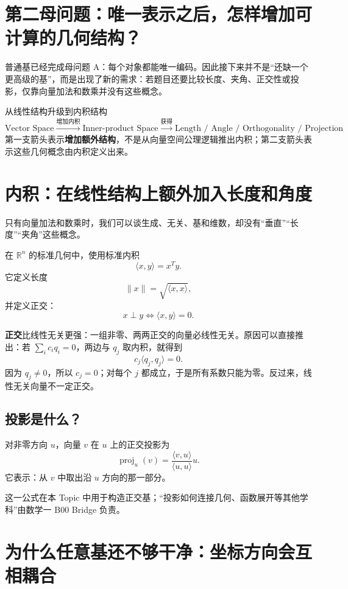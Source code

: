 \documentclass[11pt,a4paper]{ctexart}
\newcommand{\kw}[1]{\textbf{\color{deep}#1}}
\begin{document}
\section{第二母问题：唯一表示之后，怎样增加可计算的几何结构？}

普通基已经完成母问题 A：每个对象都能唯一编码。因此接下来并不是“还缺一个更高级的基”，而是出现了新的需求：若题目还要比较长度、夹角、正交性或投影，仅靠向量加法和数乘并没有这些概念。

\begin{corebox}{从线性结构升级到内积结构}
\[
\boxed{
\text{Vector Space}
\xrightarrow{\text{增加内积}}
\text{Inner-product Space}
\xrightarrow{\text{获得}}
\text{Length / Angle / Orthogonality / Projection}
}
\]
第一支箭头表示\kw{增加额外结构}，不是从向量空间公理逻辑推出内积；第二支箭头表示这些几何概念由内积定义出来。
\end{corebox}

\section{内积：在线性结构上额外加入长度和角度}

只有向量加法和数乘时，我们可以谈生成、无关、基和维数，却没有“垂直”“长度”“夹角”这些概念。

在 $\mathbb R^n$ 的标准几何中，使用标准内积
\[
\langle x,y\rangle=x^Ty.
\]
它定义长度
\[
\lVert x\rVert=\sqrt{\langle x,x\rangle},
\]
并定义正交：
\[
x\perp y\iff \langle x,y\rangle=0.
\]

\kw{正交}比线性无关更强：一组非零、两两正交的向量必线性无关。原因可以直接推出：若 $\sum_i c_iq_i=0$，两边与 $q_j$ 取内积，就得到
\[
c_j\langle q_j,q_j\rangle=0.
\]
因为 $q_j\neq0$，所以 $c_j=0$；对每个 $j$ 都成立，于是所有系数只能为零。反过来，线性无关向量不一定正交。

\subsection{投影是什么？}

对非零方向 $u$，向量 $v$ 在 $u$ 上的正交投影为
\[
\operatorname{proj}_u(v)
=\frac{\langle v,u\rangle}{\langle u,u\rangle}u.
\]
它表示：从 $v$ 中取出沿 $u$ 方向的那一部分。

这一公式在本 Topic 中用于构造正交基；“投影如何连接几何、函数展开等其他学科”由数学一 B00 Bridge 负责。

\section{为什么任意基还不够干净：坐标方向会互相耦合}
\end{document}
